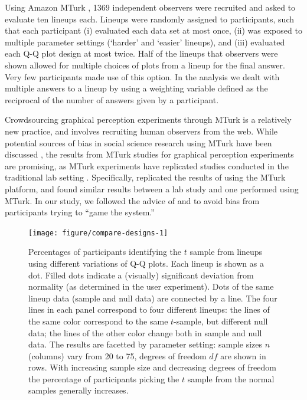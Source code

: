\documentclass[12pt]{article}\usepackage[]{graphicx}\usepackage[]{color}
\newenvironment{knitrout}{}{} %
\newcommand{\al}[1]{{\color{ForestGreen} #1}}
\newcommand{\alnote}[1]{\todo[inline,color=green!40]{#1}}
\begin{document}
Using  Amazon MTurk \citep{amazon}, 1369 independent observers were recruited and asked to evaluate ten lineups each. Lineups were randomly assigned to participants, such that each participant
(i) evaluated each data set at most once, 
(ii) was exposed to multiple parameter settings (`harder' and `easier' lineups), and
(iii) evaluated each Q-Q plot design at most twice.
Half of the lineups that observers were shown allowed for multiple choices of plots from a lineup for the final answer. Very few participants made use of this option. In the analysis we dealt with multiple answers to a lineup by using a weighting variable defined as the reciprocal of the number of answers given by a participant.

Crowdsourcing graphical perception experiments through MTurk is a relatively new practice, and involves recruiting human observers from the web. While potential sources of bias in social science research using MTurk have been discussed \cite[see, for example,][]{chandler:2014}, the results from MTurk studies for graphical perception experiments are promising, as MTurk experiments have replicated studies conducted in the traditional lab setting \citep{Kosara:2010, Heer:2010}. Specifically, \citet{Heer:2010} replicated the results of \citet{cleveland:1984} using the MTurk platform, and \citet{Kosara:2010} found similar results between a lab study and one performed using MTurk. \al{In our study, we followed the advice of \citet{Kosara:2010} and \citet{Heer:2010} to avoid bias from participants trying to ``game the system.''}


%






\alnote{Can we remove the slashes from Fig. 3?}
\begin{figure}[ht]
\centering
\begin{knitrout}
\color{fgcolor}
\texttt{[image: figure/compare-designs-1]} 

\end{knitrout}
\caption{\label{fig:compare} Percentages of participants identifying the $t$ sample from lineups using different variations of Q-Q plots. Each lineup is shown as a dot. Filled dots indicate a (visually) significant deviation from normality (as determined in the user experiment). Dots of the same lineup data (sample and null data) are connected by a line.
The four lines in each panel correspond to four different lineups: the lines of the same color correspond to the same $t$-sample, but different null data; the lines of the other color change both in sample and null data. The results are facetted by parameter setting: sample sizes $n$ (columns) vary from 20 to 75, degrees of freedom $df$ are shown in rows. With increasing sample size and decreasing degrees of freedom the percentage of participants picking the $t$ sample  from the normal samples generally increases.
}
\end{figure}
\afterpage{\clearpage}
\end{document}
